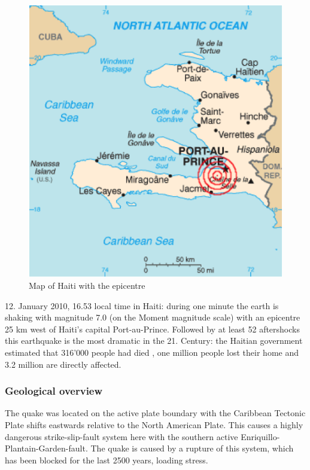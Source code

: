 \documentclass[11pt]{article}
\begin{document}
\begin{figure}
\includegraphics[scale=0.8]{Bilder/KarteHaiti.png}
\caption{Map of Haiti with the epicentre}%
\label{pic:map_haiti}
\end{figure}




12. January 2010, 16.53 local time in Haiti: during one minute the earth is shaking with magnitude 7.0 \cite{nyt:mag} (on the Moment magnitude scale) with an epicentre 25 km west of Haiti’s capital Port-au-Prince. Followed by at least 52 aftershocks  this earthquake is the most dramatic in the 21. Century: the Haitian government estimated that 316’000 people had died \cite{web:cbc1} , one million people lost their home  and 3.2 million are directly affected. \cite{web:ear}

\subsubsection*{Geological overview}

The quake was located on the active plate boundary with the Caribbean Tectonic Plate shifts eastwards relative to the North American Plate. This causes a highly dangerous strike-slip-fault system here with the southern active Enriquillo-Plantain-Garden-fault. The quake is caused by a rupture of this system, which has been blocked for the last 2500 years, loading stress. \cite{web:bbc1}
\end{document}
